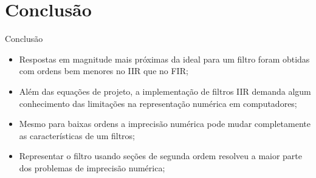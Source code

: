 \section{Conclusão}
\begin{frame}{Conclusão}
	\begin{itemize}
	    \item Respostas em magnitude mais próximas da ideal para um filtro foram obtidas com ordens bem menores no IIR que no FIR; 
	    \item Além das equações de projeto, a implementação de filtros IIR demanda algum conhecimento das limitações na representação numérica em computadores;
	    \item Mesmo para baixas ordens a imprecisão numérica pode mudar completamente as características de um filtros;
	    \item Representar o filtro usando seções de segunda ordem resolveu a maior parte dos problemas de imprecisão numérica;
	\end{itemize}
	
\end{frame}